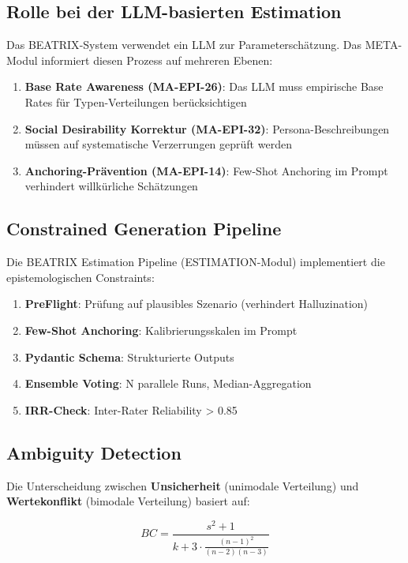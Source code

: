 \documentclass[11pt,a4paper]{article}
\theoremstyle{definition}
\theoremstyle{plain}
\newcommand{\META}{\textsc{META}}
\newcommand{\BEATRIX}{\textsc{BEATRIX}}
\begin{document}
\subsection{Rolle bei der LLM-basierten Estimation}

Das \BEATRIX-System verwendet ein LLM zur Parameterschätzung. Das \META-Modul informiert diesen Prozess auf mehreren Ebenen:

\begin{enumerate}
    \item \textbf{Base Rate Awareness (MA-EPI-26)}: Das LLM muss empirische Base Rates für Typen-Verteilungen berücksichtigen
    \item \textbf{Social Desirability Korrektur (MA-EPI-32)}: Persona-Beschreibungen müssen auf systematische Verzerrungen geprüft werden
    \item \textbf{Anchoring-Prävention (MA-EPI-14)}: Few-Shot Anchoring im Prompt verhindert willkürliche Schätzungen
\end{enumerate}

\subsection{Constrained Generation Pipeline}

Die \BEATRIX{} Estimation Pipeline (ESTIMATION-Modul) implementiert die epistemologischen Constraints:

\begin{enumerate}
    \item \textbf{PreFlight}: Prüfung auf plausibles Szenario (verhindert Halluzination)
    \item \textbf{Few-Shot Anchoring}: Kalibrierungsskalen im Prompt
    \item \textbf{Pydantic Schema}: Strukturierte Outputs
    \item \textbf{Ensemble Voting}: N parallele Runs, Median-Aggregation
    \item \textbf{IRR-Check}: Inter-Rater Reliability > 0.85
\end{enumerate}

\subsection{Ambiguity Detection}

Die Unterscheidung zwischen \textbf{Unsicherheit} (unimodale Verteilung) und \textbf{Wertekonflikt} (bimodale Verteilung) basiert auf:

\begin{equation}
BC = \frac{s^2 + 1}{k + 3 \cdot \frac{(n-1)^2}{(n-2)(n-3)}}
\end{equation}
\end{document}
